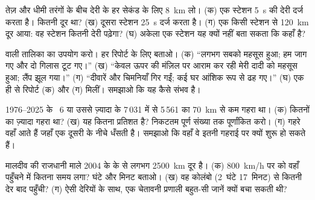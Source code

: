 \begin{exercise}[$\star\star$]\label{exo:g7:earthquakes:7}
तेज़ और धीमी तरंगों के बीच देरी के हर सेकंड के लिए \qty{8}{km} लो। (क) एक स्टेशन
\qty{5}{s} की देरी दर्ज करता है।  कितनी दूर था? (ख) दूसरा स्टेशन
\qty{25}{s} दर्ज करता है। (ग) एक  किसी स्टेशन से \qty{120}{km} दूर आया: वह
स्टेशन कितनी देरी पढ़ेगा? (घ) अकेला एक स्टेशन यह क्यों नहीं बता सकता कि 
कहाँ है?
\end{exercise}

\begin{exercise}[$\star\star$]\label{exo:g7:earthquakes:8}
 वाली तालिका का उपयोग करो। हर रिपोर्ट के लिए  बताओ। (क) ``लगभग
सबको महसूस हुआ; हम जाग गए और दो गिलास टूट गए।'' (ख) ``केवल ऊपर की मंज़िल पर
आराम कर रही मेरी दादी को महसूस हुआ; लैंप झूल गया।'' (ग) ``दीवारें और चिमनियाँ
गिर गईं; कई घर आंशिक रूप से ढह गए।'' (घ) एक ही  से रिपोर्ट (क) और (ग)
मिलीं। समझाओ कि यह कैसे संभव है।
\end{exercise}

\begin{exercise}[$\star\star$]\label{exo:g7:earthquakes:9}
1976--2025 के ~6 या उससे ज़्यादा के 7\,031  में से 5\,561 का
 \qty{70}{km} से कम गहरा था। (क) कितनों का  ज़्यादा गहरा था?
(ख) यह कितना प्रतिशत है? निकटतम पूर्ण संख्या तक पूर्णांकित करो। (ग) गहरे  वहाँ
आते हैं जहाँ एक  दूसरी के नीचे धँसती है। समझाओ कि वहाँ वे इतनी गहराई पर
क्यों शुरू हो सकते हैं।
\end{exercise}

\begin{exercise}[$\star\star$]\label{exo:g7:earthquakes:10}
मालदीव की राजधानी माले 2004 के  के  से लगभग \qty{2500}{km} दूर
है। (क) \qty{800}{km/h} पर  को वहाँ पहुँचने में कितना समय लगा? घंटे और
मिनट बताओ। (ख) वह कोलंबो (2~घंटे 17~मिनट) से कितनी देर बाद पहुँची? (ग) ऐसी
देरियों के साथ, एक चेतावनी प्रणाली बहुत-सी जानें क्यों बचा सकती
थी?
\end{exercise}

